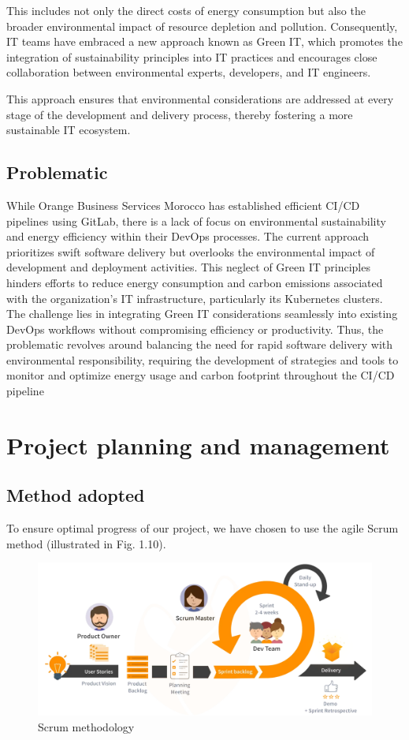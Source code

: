This includes not only the direct costs of energy consumption but also the broader environmental impact of resource depletion and pollution. Consequently, IT teams have embraced a new approach known as Green IT, which promotes the integration of sustainability principles into IT practices and encourages close collaboration between environmental experts, developers, and IT engineers.

This approach ensures that environmental considerations are addressed at every stage of the development and delivery process, thereby fostering a more sustainable IT ecosystem.

\subsection{Problematic}

While Orange Business Services Morocco has established efficient CI/CD pipelines using GitLab, there is a lack of focus on environmental sustainability and energy efficiency within their DevOps processes. The current approach prioritizes swift software delivery but overlooks the environmental impact of development and deployment activities. This neglect of Green IT principles hinders efforts to reduce energy consumption and carbon emissions associated with the organization's IT infrastructure, particularly its Kubernetes clusters. The challenge lies in integrating Green IT considerations seamlessly into existing DevOps workflows without compromising efficiency or productivity. Thus, the problematic revolves around balancing the need for rapid software delivery with environmental responsibility, requiring the development of strategies and tools to monitor and optimize energy usage and carbon footprint throughout the CI/CD pipeline
\section{Project planning and management}
\subsection{Method adopted}

To ensure optimal progress of our project, we have chosen to use the agile Scrum method (illustrated in Fig. 1.10).

\begin{figure}[H]
  \centering
  \includegraphics[width=17.5cm]{Figures/scrum.png}
  \caption{Scrum methodology}
\end{figure}

